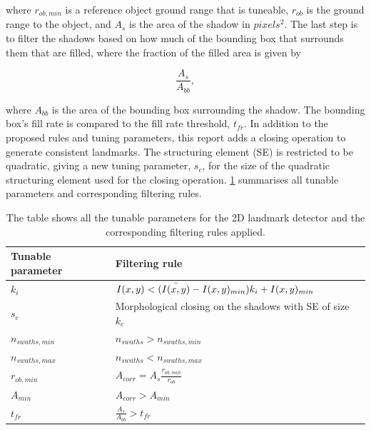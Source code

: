 where $r_{ob, min}$ is a reference object ground range that is tuneable, $r_{ob}$ is the ground range to the object, and $A_s$ is the area of the shadow in $pixels^2$. The last step is to filter the shadows based on how much of the bounding box that surrounds them that are filled, where the fraction of the filled area is given by

\begin{equation}
    \frac{A_s}{A_{bb}},
    \label{eq:fill_rate_bb}
\end{equation}

where $A_{bb}$ is the area of the bounding box surrounding the shadow. The bounding box's fill rate is compared to the fill rate threshold, $t_{fr}$. In addition to the proposed rules and tuning parameters, this report adds a closing operation to generate consistent landmarks. The structuring element (SE) is restricted to be quadratic, giving a new tuning parameter, $s_c$, for the size of the quadratic structuring element used for the closing operation. \cref{tab:2D_tuning_rules} summarises all tunable parameters and corresponding filtering rules. 

\begin{table}
    \begin{center}
    \caption{The table shows all the tunable parameters for the 2D landmark detector and the corresponding filtering rules applied.}
    \begin{tabular}{ll}
        \hline
        \textbf{Tunable parameter} & \textbf{Filtering rule}                            \\ \hline
        $k_i$             & $I(x,y) < (\Bar{I(x,y)} - I(x,y)_{min}) k_i + I(x,y)_{min}$ \\ 
        $s_c$             & Morphological closing on the shadows with SE of size $k_c$  \\ 
        $n_{swaths,min}$  & $n_{swaths} > n_{swaths,min}$                               \\ 
        $n_{swaths,max}$  & $n_{swaths} < n_{swaths,max}$                               \\ 
        $r_{ob,min}$      & $A_{corr} = A_s\frac{r_{ob,min}}{r_{ob}}$                   \\ 
        $A_{min}$         & $A_{corr} > A_{min}$                                        \\ 
        $t_{fr}$          & $\frac{A_s}{A_{bb}} > t_{fr}$                               \\ 
        \hline
    \end{tabular}
    \end{center}
    \label{tab:2D_tuning_rules}
\end{table}

